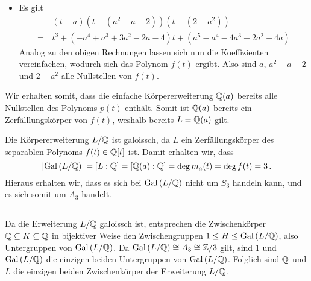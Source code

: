 \begin{itemize}
  \item
    Es gilt
    \begin{align*}
       &\,  (t - a)(t - (a^2 - a - 2))(t - (2 - a^2)) \\
      =&\,  t^3 + (-a^4 + a^3 + 3a^2 - 2a - 4) t + (a^5 - a^4 - 4a^3 + 2a^2 + 4a)
    \end{align*}
    Analog zu den obigen Rechnungen lassen sich nun die Koeffizienten vereinfachen, wodurch sich das Polynom $f(t)$ ergibt.
    Also sind $a$, $a^2 - a - 2$ und $2 - a^2$ alle Nullstellen von $f(t)$.
\end{itemize}

Wir erhalten somit, dass die einfache Körpererweiterung $\mathbb{Q}(a)$ bereits alle Nullstellen des Polynoms $p(t)$ enthält.
Somit ist $\mathbb{Q}(a)$ bereits ein Zerfälllungskörper von $f(t)$, weshalb bereits $L = \mathbb{Q}(a)$ gilt.

Die Körpererweiterung $L/\mathbb{Q}$ ist galoissch, da $L$ ein Zerfällungskörper des separablen Polynoms $f(t) \in \mathbb{Q}[t]$ ist.
Damit erhalten wir, dass
\[
    |{\operatorname{Gal}{(}L/\mathbb{Q})}|
  = [L : \mathbb{Q}]
  = [\mathbb{Q}(a) : \mathbb{Q}]
  = \deg m_a(t)
  = \deg f(t)
  = 3 \,.
\]
Hieraus erhalten wir, dass es sich bei $\operatorname{Gal}{(}L/\mathbb{Q})$ nicht um $S_3$ handeln kann, und es sich somit um $A_3$ handelt.





\subsection{}

Da die Erweiterung $L/\mathbb{Q}$ galoissch ist, entsprechen die Zwischenkörper $\mathbb{Q} \subseteq K \subseteq \mathbb{Q}$ in bijektiver Weise den Zwischengruppen $1 \leq H \leq \operatorname{Gal}{(}L/\mathbb{Q})$, also Untergruppen von $\operatorname{Gal}{(}L/\mathbb{Q})$.
Da $\operatorname{Gal}{(}L/\mathbb{Q}) \cong A_3 \cong \mathbb{Z}/3$ gilt, sind $1$ und $\operatorname{Gal}{(}L/\mathbb{Q})$ die einzigen beiden Untergruppen von $\operatorname{Gal}{(}L/\mathbb{Q})$.
Folglich sind $\mathbb{Q}$ und $L$ die einzigen beiden Zwischenkörper der Erweiterung $L/\mathbb{Q}$.




